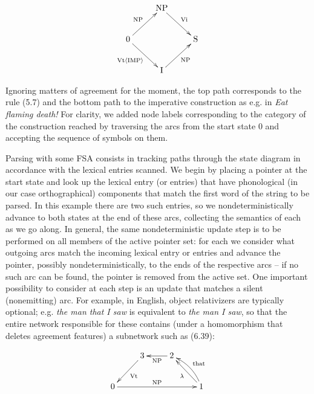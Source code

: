 \begin{equation}
\xymatrix{& \text{NP} \ar[dr]^{\text{Vi}} &\\
0 \ar[ur]^{\text{NP}}\ar[dr]_{\text{Vt}\langle\text{IMP}\rangle} & & \text{S}\\
& \text{I} \ar[ur]_{\text{NP}} & }
\end{equation}

\smallskip\noindent Ignoring matters of agreement for the moment, the top path
corresponds to the rule (5.7) and the bottom path to the imperative
construction as e.g. in {\it Eat flaming death!} For clarity, we added node
labels corresponding to the category of the construction reached by traversing
the arcs from the start state $0$ and accepting the sequence of symbols on
them. 

Parsing with some FSA consists in tracking paths through the state diagram in
accordance with the lexical entries scanned. We begin by placing a pointer at
the start state and look up the lexical entry (or entries) that have
phonological (in our case orthographical) components that match the first word
of the string to be parsed. In this example there are two such entries, so we
nondeterministically advance to both states at the end of these arcs,
collecting the semantics of each as we go along. In general, the same
nondeterministic update step is to be performed on all members of the active
pointer set: for each we consider what outgoing arcs match the incoming
lexical entry or entries and advance the pointer, possibly
nondeterministically, to the ends of the respective arcs -- if no such arc can
be found, the pointer is removed from the active set. One important
possibility to consider at each step is an update that matches a silent
(nonemitting) arc. For example, in English, object relativizers are typically
optional; e.g. {\it the man that I saw} is equivalent to {\it the man I saw},
so that the entire network responsible for these contains (under a
homomorphism that deletes agreement features) a subnetwork such as (6.39):

\begin{equation}
\xymatrix{& 3\ar[dl]^{\text{Vt}} & 2\ar[l]^{\text{NP}}&\\
0\ar[rrr]^{\text{NP}} & & & 1\ar[ul]^{\lambda}\ar@/_/[ul]_{\text{that}}}
\end{equation}

